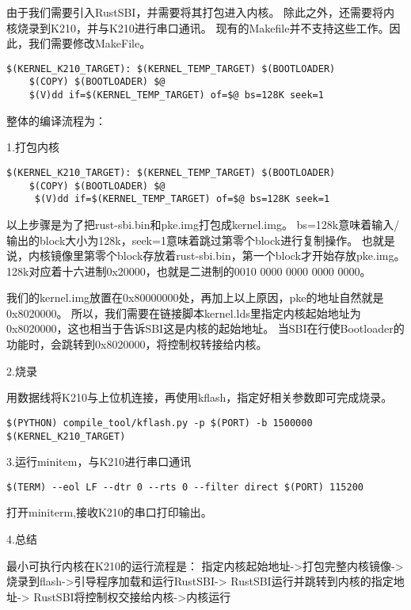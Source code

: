 由于我们需要引入RustSBI，并需要将其打包进入内核。
除此之外，还需要将内核烧录到K210，并与K210进行串口通讯。
现有的Makefile并不支持这些工作。因此，我们需要修改MakeFile。

\begin{lstlisting}[caption={修改Makefile}, label={lst:change_makefile}]
    $(KERNEL_K210_TARGET): $(KERNEL_TEMP_TARGET) $(BOOTLOADER)
    $(COPY) $(BOOTLOADER) $@
    $(V)dd if=$(KERNEL_TEMP_TARGET) of=$@ bs=128K seek=1
\end{lstlisting}

整体的编译流程为：

1.打包内核

\begin{lstlisting}[caption={打包内核}, label={lst:pack_kernel}]
    $(KERNEL_K210_TARGET): $(KERNEL_TEMP_TARGET) $(BOOTLOADER)
    $(COPY) $(BOOTLOADER) $@
     $(V)dd if=$(KERNEL_TEMP_TARGET) of=$@ bs=128K seek=1
\end{lstlisting}


以上步骤是为了把rust-sbi.bin和pke.img打包成kernel.img。
bs=128k意味着输入/输出的block大小为128k，seek=1意味着跳过第零个block进行复制操作。
也就是说，内核镜像里第零个block存放着rust-sbi.bin，第一个block才开始存放pke.img。
128k对应着十六进制0x20000，也就是二进制的0010 0000 0000 0000 0000。

我们的kernel.img放置在0x80000000处，再加上以上原因，pke的地址自然就是0x8020000。
所以，我们需要在链接脚本kernel.lds里指定内核起始地址为0x8020000，这也相当于告诉SBI这是内核的起始地址。
当SBI在行使Bootloader的功能时，会跳转到0x8020000，将控制权转接给内核。

2.烧录

用数据线将K210与上位机连接，再使用kflash，指定好相关参数即可完成烧录。

\begin{lstlisting}[caption={烧录}, label={lst:burn}]
    $(PYTHON) compile_tool/kflash.py -p $(PORT) -b 1500000 $(KERNEL_K210_TARGET)
\end{lstlisting}

3.运行minitem，与K210进行串口通讯

\begin{lstlisting}[caption={运行minitem}, label={lst:run_minitem}]
    $(TERM) --eol LF --dtr 0 --rts 0 --filter direct $(PORT) 115200
\end{lstlisting}

打开miniterm,接收K210的串口打印输出。

4.总结

最小可执行内核在K210的运行流程是：
指定内核起始地址->打包完整内核镜像->
烧录到flash->引导程序加载和运行RustSBI->
RustSBI运行并跳转到内核的指定地址->
RustSBI将控制权交接给内核->内核运行

